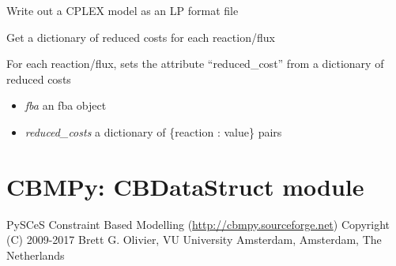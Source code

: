 \documentclass[a4paper,11pt,english]{sphinxmanual}
\begin{document}

\begin{fulllineitems}
\label{modules_doc:cbmpy.CBCPLEX.cplx_writeLPtoLPTfile}
Write out a CPLEX model as an LP format file

\end{fulllineitems}


\begin{fulllineitems}
\label{modules_doc:cbmpy.CBCPLEX.getReducedCosts}
Get a dictionary of reduced costs for each reaction/flux

\end{fulllineitems}


\begin{fulllineitems}
\label{modules_doc:cbmpy.CBCPLEX.setReducedCosts}
For each reaction/flux, sets the attribute ``reduced\_cost'' from a dictionary of
reduced costs
\begin{itemize}
\item {} 
\emph{fba} an fba object

\item {} 
\emph{reduced\_costs} a dictionary of \{reaction : value\} pairs

\end{itemize}

\end{fulllineitems}

\label{modules_doc:module-cbmpy.CBDataStruct}

\section{CBMPy: CBDataStruct module}
\label{modules_doc:cbmpy-cbdatastruct-module}
PySCeS Constraint Based Modelling (\url{http://cbmpy.sourceforge.net})
Copyright (C) 2009-2017 Brett G. Olivier, VU University Amsterdam, Amsterdam, The Netherlands
\end{document}
